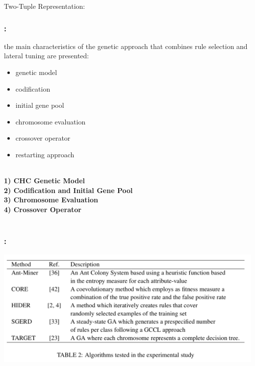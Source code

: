 \documentclass{beamer}
\begin{document}
\begin{CJK*}{UTF8}{bsmi}
\begin{frame}
\begin{block}{Two-Tuple Representation:}
		\end{block}

	
\end{frame}



\begin{frame}
	\frametitle{\insertsection : \insertsubsection}
	the main characteristics of the genetic approach that combines rule selection and lateral tuning are presented:
	\begin{itemize}
		\item  genetic model
		\item codification
		\item initial gene pool
		\item chromosome evaluation
		\item crossover operator
		\item restarting approach
	\end{itemize}
	\begin{block}{ }
		~\\
		\textbf{1) CHC Genetic Model}\\
		\textbf{2) Codification and Initial Gene Pool}\\
		\textbf{3) Chromosome Evaluation}\\
		\textbf{4) Crossover Operator}\\
		~\\
	\end{block}

\end{frame}


\begin{frame}
	\frametitle{\insertsection : \insertsubsection}
	
	\begin{center}
		\includegraphics[height=.65\textheight]{./6.png}
	\end{center}
\end{frame}


\end{CJK*}
\end{document}
